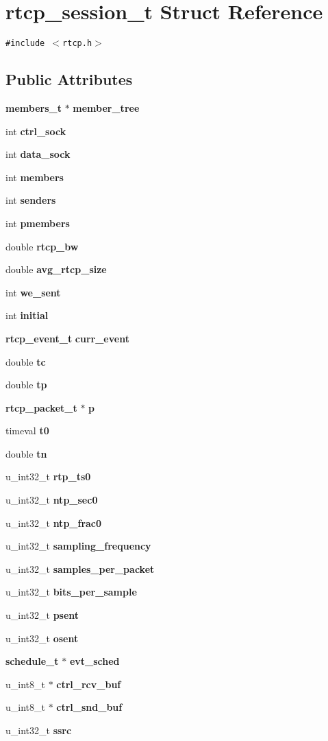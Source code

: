 \section{rtcp\_\-session\_\-t Struct Reference}
\label{structrtcp__session__t}
{\tt \#include $<$rtcp.h$>$}

\subsection*{Public Attributes}
\begin{CompactItemize}
\item 
{\bf members\_\-t} $\ast$ {\bf member\_\-tree}
\item 
int {\bf ctrl\_\-sock}
\item 
int {\bf data\_\-sock}
\item 
int {\bf members}
\item 
int {\bf senders}
\item 
int {\bf pmembers}
\item 
double {\bf rtcp\_\-bw}
\item 
double {\bf avg\_\-rtcp\_\-size}
\item 
int {\bf we\_\-sent}
\item 
int {\bf initial}
\item 
{\bf rtcp\_\-event\_\-t} {\bf curr\_\-event}
\item 
double {\bf tc}
\item 
double {\bf tp}
\item 
{\bf rtcp\_\-packet\_\-t} $\ast$ {\bf p}
\item 
timeval {\bf t0}
\item 
double {\bf tn}
\item 
u\_\-int32\_\-t {\bf rtp\_\-ts0}
\item 
u\_\-int32\_\-t {\bf ntp\_\-sec0}
\item 
u\_\-int32\_\-t {\bf ntp\_\-frac0}
\item 
u\_\-int32\_\-t {\bf sampling\_\-frequency}
\item 
u\_\-int32\_\-t {\bf samples\_\-per\_\-packet}
\item 
u\_\-int32\_\-t {\bf bits\_\-per\_\-sample}
\item 
u\_\-int32\_\-t {\bf psent}
\item 
u\_\-int32\_\-t {\bf osent}
\item 
{\bf schedule\_\-t} $\ast$ {\bf evt\_\-sched}
\item 
u\_\-int8\_\-t $\ast$ {\bf ctrl\_\-rcv\_\-buf}
\item 
u\_\-int8\_\-t $\ast$ {\bf ctrl\_\-snd\_\-buf}
\item 
u\_\-int32\_\-t {\bf ssrc}
\end{CompactItemize}


